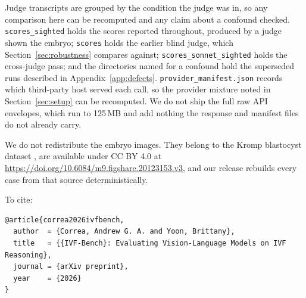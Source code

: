 \documentclass[11pt]{article}
\begin{document}
\begin{sloppypar}
Judge transcripts are grouped by the condition the judge was in, so any comparison here can be recomputed and any claim about a confound checked. \texttt{scores\_sighted} holds the scores reported throughout, produced by a judge shown the embryo; \texttt{scores} holds the earlier blind judge, which Section~\ref{sec:robustness} compares against; \texttt{scores\_sonnet\_sighted} holds the cross-judge pass; and the directories named for a confound hold the superseded runs described in Appendix~\ref{app:defects}. \texttt{provider\_manifest.json} records which third-party host served each call, so the provider mixture noted in Section~\ref{sec:setup} can be recomputed. We do not ship the full raw API envelopes, which run to 125\,MB and add nothing the response and manifest files do not already carry.
\end{sloppypar}

We do not redistribute the embryo images. They belong to the Kromp blastocyst dataset \citep{kromp2023}, are available under CC BY 4.0 at \url{https://doi.org/10.6084/m9.figshare.20123153.v3}, and our release rebuilds every case from that source deterministically.

To cite:
\vspace{-0.4em}
\begin{lstlisting}[frame=none, backgroundcolor=\color{white}]
@article{correa2026ivfbench,
  author  = {Correa, Andrew G. A. and Yoon, Brittany},
  title   = {{IVF-Bench}: Evaluating Vision-Language Models on IVF Reasoning},
  journal = {arXiv preprint},
  year    = {2026}
}
\end{lstlisting}
\end{document}

